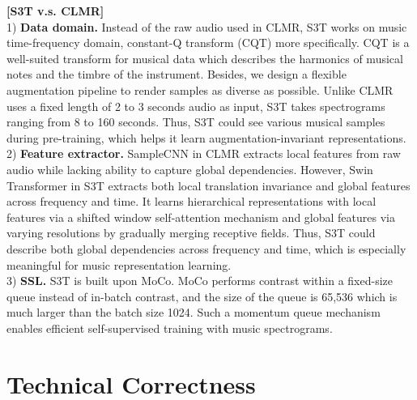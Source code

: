 \documentclass{article}
\begin{document}
\noindent\textbf{[S3T v.s. CLMR]} \\
1) \noindent\textbf{Data domain.} Instead of the raw audio used in CLMR, S3T works on music time-frequency domain, constant-Q transform (CQT) more specifically. CQT is a well-suited transform for musical data which describes the harmonics of musical notes and the timbre of the instrument. Besides, we design a flexible augmentation pipeline to render samples as diverse as possible. Unlike CLMR uses a fixed length of 2 to 3 seconds audio as input, S3T takes spectrograms ranging from 8 to 160 seconds. Thus, S3T could see various musical samples during pre-training, which helps it learn augmentation-invariant representations.
\\
2) \noindent\textbf{Feature extractor.} SampleCNN in CLMR extracts local features from raw audio while lacking ability to capture global dependencies. However, Swin Transformer in S3T extracts both local translation invariance and global features across frequency and time. It learns hierarchical representations with local features via a shifted window self-attention mechanism and global features via varying resolutions by gradually merging receptive fields. Thus, S3T could describe both global dependencies across frequency and time, which is especially meaningful for music representation learning.
\\
3) \noindent\textbf{SSL.} S3T is built upon MoCo. MoCo performs contrast within a fixed-size queue instead of in-batch contrast, and the size of the queue is 65,536 which is much larger than the batch size 1024. Such a momentum queue mechanism enables efficient self-supervised training with music spectrograms. 

\section{Technical Correctness}
\end{document}
